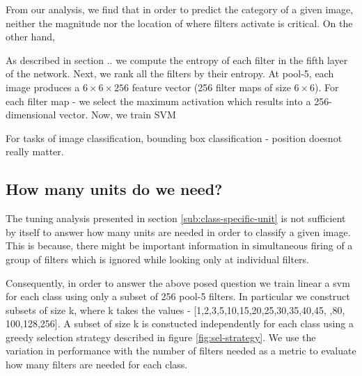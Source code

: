 \documentclass[runningheads]{llncs}
\begin{document}
From our analysis, we find that in order to predict the category of a given image, neither the magnitude nor the location of where filters activate is critical. On the other hand, 


As described in section .. we compute the entropy of each filter in the fifth layer of the network. Next, we rank all the filters by their entropy. At pool-5, each image produces a $6 \times 6 \times 256 $ feature vector (256 filter maps of size $6 \times 6$). For each filter map - we select the maximum activation which results into a 256-dimensional vector. Now, we train SVM 
 
For tasks of image classification, bounding box classification - position doesnot really matter. 

\subsection{How many units do we need?}
\label{sub:how-many}
The tuning analysis presented in section \ref{sub:class-specific-unit} is not sufficient by itself to answer how many units are needed in order to classify a given image. This is because, there might be important information in simultaneous firing of a group of filters which is ignored while looking only at individual filters. 

Consequently, in order to answer the above posed question we train linear a svm for each class using only a subset of 256 pool-5 filters. In particular we construct subsets of size k, where k takes the values - [1,2,3,5,10,15,20,25,30,35,40,45, ,80, 100,128,256]. A subset of size k is constucted independently for each class using a greedy selection strategy described in figure \ref{fig:sel-strategy}. We use the variation in performance with the number of filters needed as a metric to evaluate how many filters are needed for each class. 
  
\end{document}
